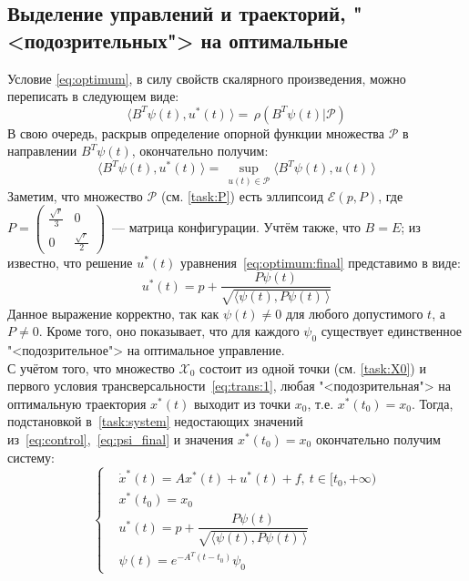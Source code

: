 \documentclass[11pt, oneside, final]{article}
\theoremstyle{break}
\numberwithin{equation}{section}
\theoremstyle{plain}
\theoremstyle{definition}
\newcommand{\scalar}[2]{\langle #1, #2\,\rangle}
\begin{document}
    \subsection{Выделение управлений и траекторий, "<подозрительных"> на оптимальные} %
    \label{sub:pseudo_optimum}
    Условие \eqref{eq:optimum}, в силу свойств скалярного произведения, можно переписать в следующем виде:
    \begin{equation*}
        \scalar{B^{T}\psi(t)}{u^{*}(t)} = \, \rho(B^{T}\psi(t)|\mathcal{P}) \label{eq:optimum2}  
    \end{equation*}
    В свою очередь, раскрыв определение опорной функции множества \(\mathcal{P}\) в направлении \(B^{T}\psi(t)\), окончательно получим:
    \begin{equation}
        \label{eq:optimum:final}
        \scalar{B^{T}\psi(t)}{u^{*}(t)} = \, \sup_{u(t)\in\mathcal{P}}\scalar{B^{T}\psi(t)}{u(t)}
    \end{equation}
    Заметим, что множество \(\mathcal{P}\) (см. \eqref{task:P}) есть эллипсоид \( \mathcal{E}(p, P)\), где \(P = 
    \left(\begin{smallmatrix} \frac{\sqrt{r}}{3} & 0 \\ 0 & \frac{\sqrt{r}}{2} \end{smallmatrix}\right)\)~--- матрица конфигурации.
    Учтём также, что \(B = E\); из \cite{Roublev:optimal:linear} известно, что решение \(u^{*}(t)\) уравнения~\eqref{eq:optimum:final} представимо в виде:
    \begin{equation}
    \label{eq:control}
        u^{*}(t) = p + \dfrac{P\psi(t)}{\sqrt{\scalar{\psi(t)}{P\psi(t)}}}
    \end{equation}
    Данное выражение корректно, так как \(\psi(t) \neq 0\) для любого допустимого \(t\), а \(P \neq 0\). Кроме того, оно показывает, что для каждого \(\psi_0\) существует единственное "<подозрительное"> на оптимальное управление. \\
    С учётом того, что множество \(\mathcal{X}_0\) состоит из одной точки (см. \eqref{task:X0}) и первого условия трансверсальности~\eqref{eq:trans:1}, любая "<подозрительная"> на оптимальную траектория \(x^{*}(t)\) выходит из точки \(x_0\), т.е. \(x^{*}(t_0) = x_0\). Тогда, подстановкой в~\eqref{task:system} недостающих значений из~\eqref{eq:control},~\eqref{eq:psi_final} и значения \(x^{*}(t_0) = x_0\) окончательно получим систему:
    \begin{equation}
        \label{eq:system_final}
        \left\{
        \begin{aligned}
            & \dot x^{*}(t) = Ax^{*}(t) + u^{*}(t) + f,\:t \in [t_0, +\infty) \\
            & x^{*}(t_0) = x_0 \\
            & u^{*}(t) = p + \dfrac{P\psi(t)}{\sqrt{\scalar{\psi(t)}{P\psi(t)}}} \\
            & \psi(t) = e^{-A^{T}(t - t_0)}\psi_0
        \end{aligned}
        \right.
    \end{equation}
\end{document}
